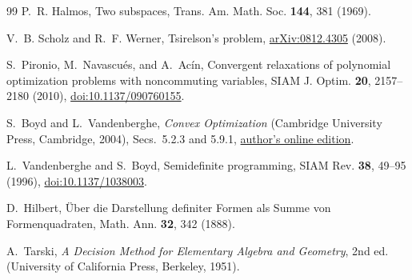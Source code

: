 \begin{thebibliography}{99}
P.~R. Halmos,
Two subspaces,
Trans. Am. Math. Soc. \textbf{144}, 381 (1969).

V.~B. Scholz and R.~F. Werner,
Tsirelson's problem,
\href{https://arxiv.org/abs/0812.4305}{arXiv:0812.4305} (2008).

S.~Pironio, M.~Navascu\'es, and A.~Ac\'in,
Convergent relaxations of polynomial optimization problems with noncommuting variables,
SIAM J. Optim. \textbf{20}, 2157--2180 (2010),
\href{https://doi.org/10.1137/090760155}{doi:10.1137/090760155}.

S.~Boyd and L.~Vandenberghe,
\emph{Convex Optimization} (Cambridge University Press, Cambridge, 2004),
Secs.~5.2.3 and 5.9.1,
\href{https://web.stanford.edu/~boyd/cvxbook/}{author's online edition}.

L.~Vandenberghe and S.~Boyd,
Semidefinite programming,
SIAM Rev. \textbf{38}, 49--95 (1996),
\href{https://doi.org/10.1137/1038003}{doi:10.1137/1038003}.

D.~Hilbert,
\"Uber die Darstellung definiter Formen als Summe von Formenquadraten,
Math. Ann. \textbf{32}, 342 (1888).

A.~Tarski,
\emph{A Decision Method for Elementary Algebra and Geometry},
2nd ed. (University of California Press, Berkeley, 1951).

\end{thebibliography}
